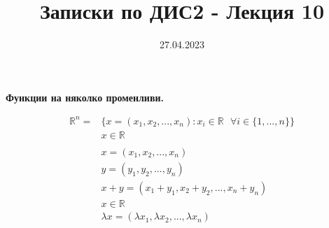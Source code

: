 \documentclass[12pt]{article}
\newcommand{\spc}{\text{ }}
\begin{document}
	\color{white}
	\pagecolor{darkgray}
	\title{Записки по ДИС2 - Лекция 10}
	\date{27.04.2023}
	\maketitle
	\begin{center}
		\Large
		\textbf{Функции на няколко променливи.}
	\end{center}
	
	\begin{align*}\mathbb{R}^{n} = &\{x=(x_1,x_2,...,x_n):x_i\in\mathbb{R} \spc\forall i\in\{1,...,n\}\}\\
	&x\in\mathbb{R}\\
	\spc\\
	&x=(x_1,x_2,...,x_n)\\
	&y=(y_1,y_2,...,y_n)\\
	&x+y=(x_1+y_1,x_2+y_2,...,x_n+y_n)\\
	&x\in\mathbb{R}\\
	&\lambda x =(\lambda x_1, \lambda x_2, ..., \lambda x_n)\\
	\end{align*}
	
\end{document}
